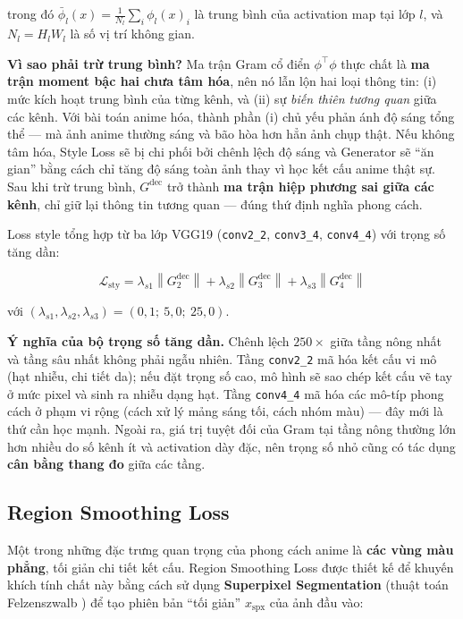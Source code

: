 \noindent trong đó $\bar{\phi}_l(x) = \frac{1}{N_l}\sum_{i} \phi_l(x)_i$ là trung bình của activation map tại lớp $l$, và $N_l = H_l W_l$ là số vị trí không gian.

\textbf{Vì sao phải trừ trung bình?} Ma trận Gram cổ điển $\phi^{\top}\phi$ thực chất là \textbf{ma trận moment bậc hai chưa tâm hóa}, nên nó lẫn lộn hai loại thông tin: (i) mức kích hoạt trung bình của từng kênh, và (ii) sự \textit{biến thiên tương quan} giữa các kênh. Với bài toán anime hóa, thành phần (i) chủ yếu phản ánh độ sáng tổng thể --- mà ảnh anime thường sáng và bão hòa hơn hẳn ảnh chụp thật. Nếu không tâm hóa, Style Loss sẽ bị chi phối bởi chênh lệch độ sáng và Generator sẽ ``ăn gian'' bằng cách chỉ tăng độ sáng toàn ảnh thay vì học kết cấu anime thật sự. Sau khi trừ trung bình, $G^{\text{dec}}$ trở thành \textbf{ma trận hiệp phương sai giữa các kênh}, chỉ giữ lại thông tin tương quan --- đúng thứ định nghĩa phong cách.

Loss style tổng hợp từ ba lớp VGG19 (\texttt{conv2\_2}, \texttt{conv3\_4}, \texttt{conv4\_4}) với trọng số tăng dần:

\begin{equation}
\label{eq:style_loss}
\mathcal{L}_{\text{sty}} = \lambda_{s1} \left\|G_2^{\text{dec}}\right\| + \lambda_{s2} \left\|G_3^{\text{dec}}\right\| + \lambda_{s3} \left\|G_4^{\text{dec}}\right\|
\end{equation}

\noindent với $(\lambda_{s1}, \lambda_{s2}, \lambda_{s3}) = (0{,}1;\ 5{,}0;\ 25{,}0)$.

\textbf{Ý nghĩa của bộ trọng số tăng dần.} Chênh lệch $250\times$ giữa tầng nông nhất và tầng sâu nhất không phải ngẫu nhiên. Tầng \texttt{conv2\_2} mã hóa kết cấu vi mô (hạt nhiễu, chi tiết da); nếu đặt trọng số cao, mô hình sẽ sao chép kết cấu vẽ tay ở mức pixel và sinh ra nhiễu dạng hạt. Tầng \texttt{conv4\_4} mã hóa các mô-típ phong cách ở phạm vi rộng (cách xử lý mảng sáng tối, cách nhóm màu) --- đây mới là thứ cần học mạnh. Ngoài ra, giá trị tuyệt đối của Gram tại tầng nông thường lớn hơn nhiều do số kênh ít và activation dày đặc, nên trọng số nhỏ cũng có tác dụng \textbf{cân bằng thang đo} giữa các tầng.

\subsection{Region Smoothing Loss}
\label{subsec:region_loss}

Một trong những đặc trưng quan trọng của phong cách anime là \textbf{các vùng màu phẳng}, tối giản chi tiết kết cấu. Region Smoothing Loss được thiết kế để khuyến khích tính chất này bằng cách sử dụng \textbf{Superpixel Segmentation} (thuật toán Felzenszwalb \cite{Felzenszwalb2004}) để tạo phiên bản ``tối giản'' $x_{\text{spx}}$ của ảnh đầu vào:

